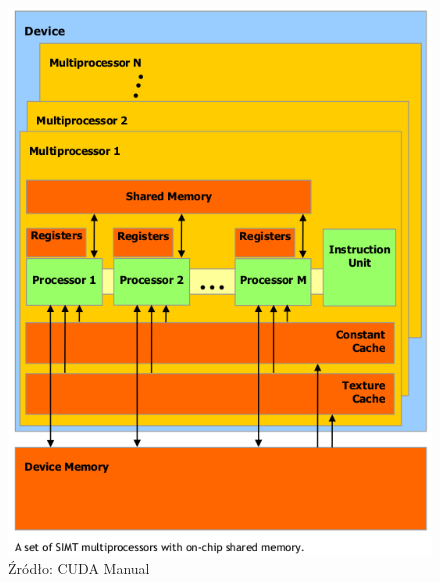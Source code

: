 \begin{figure}[ht]
\centering
\includegraphics[scale=0.8]{images/gpu.png}
\caption{Źródło: CUDA Manual}
\end{figure}

